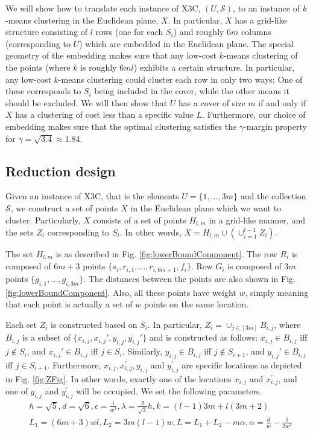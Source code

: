 \documentclass[12pt]{article}
\newcommand{\mc}{\mathcal}
\begin{document}
We will show how to translate each instance of X3C, $(U,\mc S)$, to an instance of $k$-means clustering in the Euclidean plane, $X$. In particular, $X$ has a grid-like structure consisting of $l$ rows (one for each $S_i$) and roughly $6m$ columns (corresponding to $U$) which are embedded in the Euclidean plane. The special geometry of the embedding makes sure that any low-cost $k$-means clustering of the points (where $k$ is roughly $6ml$) exhibits a certain structure. In particular, any low-cost $k$-means clustering could cluster each row in only two ways; One of these corresponds to $S_i$ being included in the cover, while the other means it should be excluded. We will then show that $U$ has a cover of size $m$ if and only if $X$ has a clustering of cost less than a specific value $L$. Furthermore, our choice of embedding makes sure that the optimal clustering satisfies the $\gamma$-margin property for $\gamma=\sqrt{3.4} \approx 1.84$.


\subsection{Reduction design}
Given an instance of X3C, that is the elements $U = \{1, \ldots, 3m\}$ and the collection $\mc S$, we construct a set of points $X$ in the Euclidean plane which we want to cluster. Particularly, $X$ consists of a set of points $H_{l,m}$ in a grid-like manner, and the sets $Z_i$ corresponding to $S_i$. In other words, $X = H_{l,m} \cup (\cup_{i=1}^{l-1} Z_i)$. 

The set $H_{l,m}$ is as described in Fig. \ref{fig:lowerBoundComponent}. The row $R_i$ is composed of $6m + 3$ points $\{s_i, r_{i, 1}, \ldots, r_{i, 6m+1}, f_i\}$. Row $G_i$ is composed of $3m$ points $\{g_{i,1}, \ldots, g_{i, 3m}\}$. The distances between the points are also shown in Fig. \ref{fig:lowerBoundComponent}. Also, all these points have weight $w$, simply meaning that each point is actually a set of $w$ points on the same location.

Each set $Z_i$ is constructed based on $S_i$. In particular, $Z_i = \cup_{j\in [3m]} B_{i,j}$, where $B_{i,j}$ is a subset of $\{x_{i,j},x_{i,j}',y_{i,j},y_{i,j}'\}$ and is constructed as follows: $x_{i,j} \in B_{i,j}$ iff $j \not\in S_i$, and $x_{i,j}' \in B_{i,j}$ iff $j \in S_i$. Similarly,  $y_{i,j} \in B_{i,j}$ iff $j \not\in S_{i+1}$, and $y_{i,j}' \in B_{i,j}$ iff $j \in S_{i+1}$. Furthermore, $x_{i, j}, x_{i,j}^\prime, y_{i,j}$ and $y_{i, j}^\prime$ are specific locations as depicted in Fig. \ref{fig:ZFig}. In other words, exactly one of the locations $x_{i,j}$ and $x_{i,j}^\prime$, and one of $y_{i,j}$ and $y_{i,j}^\prime$ will be occupied. We set the following parameters. 
\vspace{-0.1in}
\begin{align*}
&h = \sqrt{5}, d = \sqrt{6}, \epsilon = \frac{1}{w^2}, \lambda = \frac{2}{\sqrt{3}}h, k = (l-1)3m + l(3m+2)\\
& L_1 = (6m+3)wl, L_2 = 3m(l-1)w, L = L_1 + L_2 - m\alpha, \alpha = \frac{d}{w}-\frac{1}{2w^3}
\end{align*}
\end{document}
